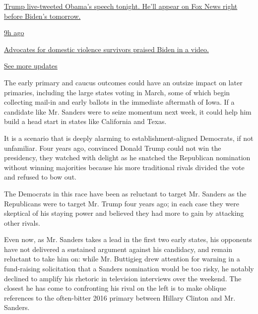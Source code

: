 \href{https://www.nytimes3xbfgragh.onion/live/2020/08/19/us/dnc-convention-election?action=click\&pgtype=Article\&state=default\&region=MAIN_CONTENT_1\&context=storylines_live_updates\#trump-live-tweeted-obamas-speech-tonight-hell-appear-on-fox-news-right-before-bidens-tomorrow}{Trump
live-tweeted Obama's speech tonight. He'll appear on Fox News right
before Biden's tomorrow.}

\href{https://www.nytimes3xbfgragh.onion/live/2020/08/19/us/dnc-convention-election?action=click\&pgtype=Article\&state=default\&region=MAIN_CONTENT_1\&context=storylines_live_updates\#advocates-for-domestic-violence-survivors-praised-biden-in-a-video}{9h
ago}

\href{https://www.nytimes3xbfgragh.onion/live/2020/08/19/us/dnc-convention-election?action=click\&pgtype=Article\&state=default\&region=MAIN_CONTENT_1\&context=storylines_live_updates\#advocates-for-domestic-violence-survivors-praised-biden-in-a-video}{Advocates
for domestic violence survivors praised Biden in a video.}

\href{https://www.nytimes3xbfgragh.onion/live/2020/08/19/us/dnc-convention-election?action=click\&pgtype=Article\&state=default\&region=MAIN_CONTENT_1\&context=storylines_live_updates}{See
more updates}

The early primary and caucus outcomes could have an outsize impact on
later primaries, including the large states voting in March, some of
which begin collecting mail-in and early ballots in the immediate
aftermath of Iowa. If a candidate like Mr. Sanders were to seize
momentum next week, it could help him build a head start in states like
California and Texas.

It is a scenario that is deeply alarming to establishment-aligned
Democrats, if not unfamiliar. Four years ago, convinced Donald Trump
could not win the presidency, they watched with delight as he snatched
the Republican nomination without winning majorities because his more
traditional rivals divided the vote and refused to bow out.

The Democrats in this race have been as reluctant to target Mr. Sanders
as the Republicans were to target Mr. Trump four years ago; in each case
they were skeptical of his staying power and believed they had more to
gain by attacking other rivals.

Even now, as Mr. Sanders takes a lead in the first two early states, his
opponents have not delivered a sustained argument against his candidacy,
and remain reluctant to take him on: while Mr. Buttigieg drew attention
for warning in a fund-raising solicitation that a Sanders nomination
would be too risky, he notably declined to amplify his rhetoric in
television interviews over the weekend. The closest he has come to
confronting his rival on the left is to make oblique references to the
often-bitter 2016 primary between Hillary Clinton and Mr. Sanders.

